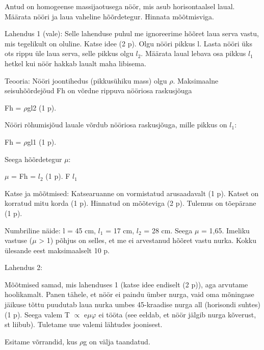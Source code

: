 
Antud on homogeense massijaotusega nöör, mis asub horisontaalsel laual. Määrata nööri ja laua vaheline hõõrdetegur. Hinnata mõõtmisviga.

\hint

\solu
Lahendus 1 (vale): Selle lahenduse puhul me ignoreerime hõõret laua serva vastu, mis tegelikult on oluline. Katse idee (2 p). Olgu nööri pikkus l. Lasta nööri üks ots rippu üle laua serva, selle pikkus olgu $l_2$. Määrata laual lebava osa pikkus $l_1$ hetkel kui nöör hakkab laualt maha libisema.

Teooria: Nööri joontihedus (pikkusühiku mass) olgu $\rho$. Maksimaalne seisuhõõrdejõud Fh on võrdne rippuva nööriosa raskusjõuga

Fh = $\rho$gl2 (1 p).

Nööri rõhumisjõud lauale võrdub nööriosa raskusjõuga, mille pikkus on $l_1$:

Fh = $\rho$gl1 (1 p).

Seega hõõrdetegur $\mu$:

$\mu$ = Fh = $l_2$ (1 p). F $l_1$

Katse ja mõõtmised: Katsearuanne on vormistatud arusaadavalt (1 p). Katset on korratud mitu korda (1 p). Hinnatud on mõõteviga (2 p). Tulemus on tõepärane (1 p).

Numbriline näide: l = 45 cm, $l_1$ = 17 cm, $l_2$ = 28 cm. Seega $\mu$ = 1,65. Imeliku vastuse ($\mu$ > 1) põhjus on selles, et me ei arvestanud hõõret vastu nurka. Kokku ülesande eest maksimaalselt 10 p.

Lahendus 2:

Mõõtmised samad, mis lahenduses 1 (katse idee endiselt (2 p)), aga arvutame hoolikamalt. Panen tähele, et nöör ei paindu ümber nurga, vaid oma mõningase jäikuse tõttu puudutab laua nurka umbes 45-kraadise nurga all (horisondi suhtes) (1 p). Seega valem T $\propto$ e$\mu\varphi$ ei tööta (see eeldab, et nöör jälgib nurga kõverust, st liibub). Tuletame uue valemi lähtudes joonisest.

Esitame võrrandid, kus $\rho$g on välja taandatud.

